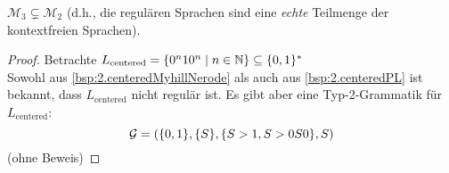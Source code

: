 \begin{lemma}
	$\mathcal{M}_3 \subsetneq \mathcal{M}_2$ (d.h., die regulären Sprachen sind eine \emph{echte} Teilmenge der kontextfreien Sprachen).
\end{lemma}
\begin{proof}
	Betrachte $L_\text{centered}=\{0^n10^n \mid n\in\mathbb{N} \}\subseteq\{0,1\}^*$\\
	Sowohl aus \autoref{bsp:2.centeredMyhillNerode} als auch aus \autoref{bsp:2.centeredPL} ist bekannt, 
	dass $L_\text{centered}$ nicht regulär ist.
	Es gibt aber eine Typ-2-Grammatik für $L_\text{centered}$:
	\[ \mathcal{G} = (\{0,1\}, \{S\}, \{S\->1, S\->0S0 \}, S) \]
	(ohne Beweis)
\end{proof}





